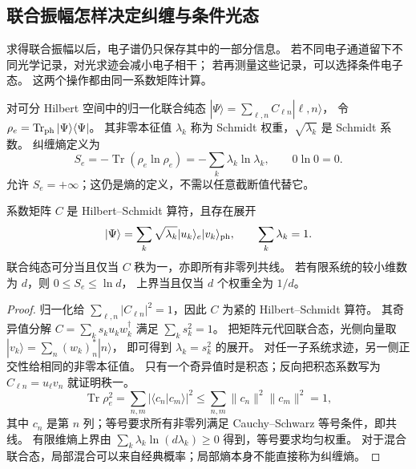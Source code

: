 \subsection{联合振幅怎样决定纠缠与条件光态}
\label{chap:feqo-conditioning}
求得联合振幅以后，电子谱仍只保存其中的一部分信息。
若不同电子通道留下不同光学记录，对光求迹会减小电子相干；
若再测量这些记录，可以选择条件电子态。
这两个操作都由同一系数矩阵计算。

\begin{definition}
对可分 Hilbert 空间中的归一化联合纯态
$|\Psi\rangle=\sum_{\ell,n}C_{\ell n}|\ell,n\rangle$，
令 $\rho_e=\operatorname{Tr}_{\rm ph}|\Psi\rangle\langle\Psi|$。
其非零本征值 $\lambda_k$ 称为 Schmidt 权重，$\sqrt{\lambda_k}$ 是 Schmidt 系数。
纠缠熵定义为
\begin{equation}
S_e=-\operatorname{Tr}(\rho_e\ln\rho_e)
=-\sum_k\lambda_k\ln\lambda_k,\qquad0\ln0=0.
\label{eq:feqo-entanglement-entropy}
\end{equation}
允许 $S_e=+\infty$；这仍是熵的定义，不需以任意截断值代替它。
\end{definition}

\begin{theorem}[联合振幅的奇异值与可分性]
系数矩阵 $C$ 是 Hilbert--Schmidt 算符，且存在展开
\begin{equation}
|\Psi\rangle=\sum_k\sqrt{\lambda_k}|u_k\rangle_e|v_k\rangle_{\rm ph},
\qquad\sum_k\lambda_k=1.
\label{eq:feqo-schmidt-decomposition}
\end{equation}
联合纯态可分当且仅当 $C$ 秩为一，亦即所有非零列共线。
若有限系统的较小维数为 $d$，则 $0\le S_e\le\ln d$，
上界当且仅当 $d$ 个权重全为 $1/d$。
\end{theorem}
\begin{proof}
归一化给 $\sum_{\ell,n}|C_{\ell n}|^2=1$，因此 $C$ 为紧的 Hilbert--Schmidt 算符。
其奇异值分解 $C=\sum_k s_k u_k w_k^\dagger$ 满足 $\sum_ks_k^2=1$。
把矩阵元代回联合态，光侧向量取 $|v_k\rangle=\sum_n(w_k)_n^*|n\rangle$，
即可得到 $\lambda_k=s_k^2$ 的展开。
对任一子系统求迹，另一侧正交性给相同的非零本征值。
只有一个奇异值时是积态；反向把积态系数写为 $C_{\ell n}=u_\ell v_n$ 就证明秩一。
\begin{equation}
\operatorname{Tr}\rho_e^2
=\sum_{n,m}|\langle c_n|c_m\rangle|^2\le
\sum_{n,m}\|c_n\|^2\|c_m\|^2=1,
\label{eq:feqo-entanglement-column-test}
\end{equation}
其中 $c_n$ 是第 $n$ 列；等号要求所有非零列满足 Cauchy--Schwarz 等号条件，即共线。
有限维熵上界由
$\sum_k\lambda_k\ln(d\lambda_k)\ge0$ 得到，等号要求均匀权重。
对于混合联合态，局部混合可以来自经典概率；局部熵本身不能直接称为纠缠熵。
\end{proof}

